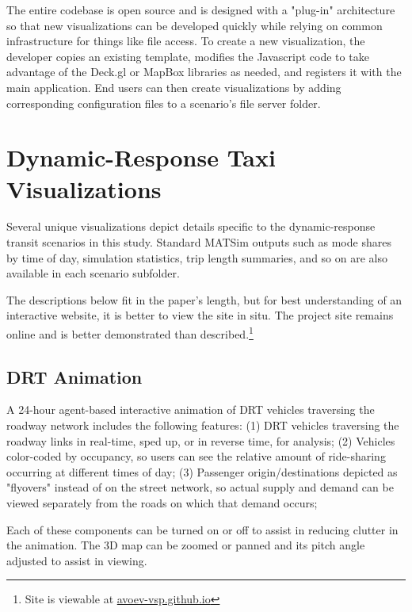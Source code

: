 \documentclass[3p,times,procedia]{elsarticle}
\begin{document}
The entire codebase is open source and is designed with a "plug-in" architecture so that new visualizations can be developed quickly while relying on common infrastructure for things like file access. To create a new visualization, the developer copies an existing template, modifies the Javascript code to take advantage of the Deck.gl or MapBox libraries as needed, and registers it with the main application. End users can then create visualizations by adding corresponding configuration files to a scenario's file server folder.

\section{Dynamic-Response Taxi Visualizations}
\label{drtviz}

Several unique visualizations depict details specific to the dynamic-response transit scenarios in this study. Standard MATSim outputs such as mode shares by time of day, simulation statistics, trip length summaries, and so on are also available in each scenario subfolder.

The descriptions below fit in the paper's length, but for best understanding of an interactive website, it is better to view the site in situ. The project site remains online and is better demonstrated than described.\footnote{Site is viewable at \href{https://avoev-vsp.github.io}{avoev-vsp.github.io}}

\subsection{DRT Animation}

A 24-hour agent-based interactive animation of DRT vehicles traversing the roadway network includes the following features: (1) DRT vehicles traversing the roadway links in real-time, sped up, or in reverse time, for analysis; (2) Vehicles color-coded by occupancy, so users can see the relative amount of ride-sharing occurring at different times of day; (3) Passenger origin/destinations depicted as "flyovers" instead of on the street network, so actual supply and demand can be viewed separately from the roads on which that demand occurs;

Each of these components can be turned on or off to assist in reducing clutter in the animation. The 3D map can be zoomed or panned and its pitch angle adjusted to assist in viewing.
\end{document}
